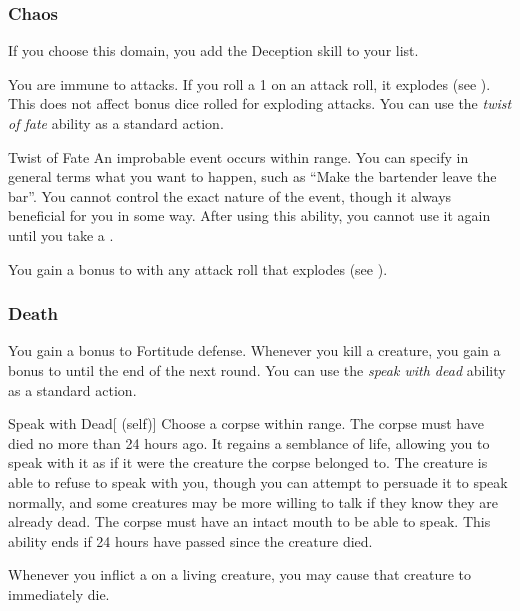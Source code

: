         \subsubsection{Chaos}
            If you choose this domain, you add the Deception skill to your  list.

             You are immune to  attacks.
             If you roll a 1 on an attack roll, it explodes (see ).
            This does not affect bonus dice rolled for exploding attacks.
             You can use the \textit{twist of fate} ability as a standard action.
            \begin{freeability}{Twist of Fate}
                An improbable event occurs within \rnglong range.
                You can specify in general terms what you want to happen, such as ``Make the bartender leave the bar''.
                You cannot control the exact nature of the event, though it always beneficial for you in some way.
                After using this ability, you cannot use it again until you take a .
            \end{freeability}
             You gain a  bonus to  with any attack roll that explodes (see ).

        \subsubsection{Death}
             You gain a  bonus to Fortitude defense.
             Whenever you kill a creature, you gain a  bonus to  until the end of the next round.
             You can use the \textit{speak with dead} ability as a standard action.
            \begin{attuneability}{Speak with Dead}[ (self)]
                Choose a corpse within \rngshort range.
                The corpse must have died no more than 24 hours ago.
                It regains a semblance of life, allowing you to speak with it as if it were the creature the corpse belonged to.
                The creature is able to refuse to speak with you, though you can attempt to persuade it to speak normally, and some creatures may be more willing to talk if they know they are already dead.
                The corpse must have an intact mouth to be able to speak.
                This ability ends if 24 hours have passed since the creature died.
            \end{attuneability}
             Whenever you inflict a  on a living creature, you may cause that creature to immediately die.

